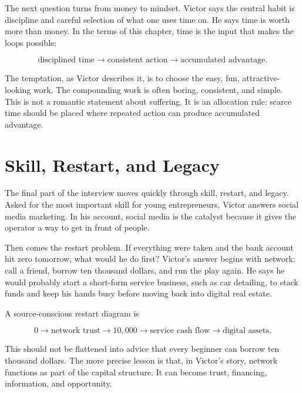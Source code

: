 The next question turns from money to mindset. Victor says the central habit is discipline and careful selection of what one uses time on. He says time is worth more than money. In the terms of this chapter, time is the input that makes the loops possible:

\begin{equation}
\text{disciplined time}
\longrightarrow
\text{consistent action}
\longrightarrow
\text{accumulated advantage}.
\end{equation}

The temptation, as Victor describes it, is to choose the easy, fun, attractive-looking work. The compounding work is often boring, consistent, and simple. This is not a romantic statement about suffering. It is an allocation rule: scarce time should be placed where repeated action can produce accumulated advantage.

\section{Skill, Restart, and Legacy}

The final part of the interview moves quickly through skill, restart, and legacy. Asked for the most important skill for young entrepreneurs, Victor answers social media marketing. In his account, social media is the catalyst because it gives the operator a way to get in front of people.

Then comes the restart problem. If everything were taken and the bank account hit zero tomorrow, what would he do first? Victor's answer begins with network: call a friend, borrow ten thousand dollars, and run the play again. He says he would probably start a short-form service business, such as car detailing, to stack funds and keep his hands busy before moving back into digital real estate.

A source-conscious restart diagram is

\begin{equation}
0
\longrightarrow
\text{network trust}
\longrightarrow
10{,}000
\longrightarrow
\text{service cash flow}
\longrightarrow
\text{digital assets}.
\end{equation}

This should not be flattened into advice that every beginner can borrow ten thousand dollars. The more precise lesson is that, in Victor's story, network functions as part of the capital structure. It can become trust, financing, information, and opportunity.


